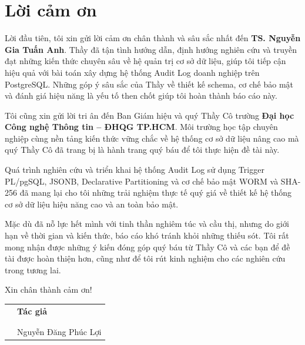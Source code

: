 \chapter*{Lời cảm ơn}

Lời đầu tiên, tôi xin gửi lời cảm ơn chân thành và sâu sắc nhất đến \textbf{TS. Nguyễn Gia Tuấn Anh}. Thầy đã tận tình hướng dẫn, định hướng nghiên cứu và truyền đạt những kiến thức chuyên sâu về hệ quản trị cơ sở dữ liệu, giúp tôi tiếp cận hiệu quả với bài toán xây dựng hệ thống Audit Log doanh nghiệp trên PostgreSQL. Những góp ý sâu sắc của Thầy về thiết kế schema, cơ chế bảo mật và đánh giá hiệu năng là yếu tố then chốt giúp tôi hoàn thành báo cáo này.

Tôi cũng xin gửi lời tri ân đến Ban Giám hiệu và quý Thầy Cô trường \textbf{Đại học Công nghệ Thông tin -- ĐHQG TP.HCM}. Môi trường học tập chuyên nghiệp cùng nền tảng kiến thức vững chắc về hệ thống cơ sở dữ liệu nâng cao mà quý Thầy Cô đã trang bị là hành trang quý báu để tôi thực hiện đề tài này.

Quá trình nghiên cứu và triển khai hệ thống Audit Log sử dụng Trigger PL/pgSQL, JSONB, Declarative Partitioning và cơ chế bảo mật WORM và SHA-256 đã mang lại cho tôi những trải nghiệm thực tế quý giá về thiết kế hệ thống cơ sở dữ liệu hiệu năng cao và an toàn bảo mật.

Mặc dù đã nỗ lực hết mình với tinh thần nghiêm túc và cầu thị, nhưng do giới hạn về thời gian và kiến thức, báo cáo khó tránh khỏi những thiếu sót. Tôi rất mong nhận được những ý kiến đóng góp quý báu từ Thầy Cô và các bạn để đề tài được hoàn thiện hơn, cũng như để tôi rút kinh nghiệm cho các nghiên cứu trong tương lai.

Xin chân thành cảm ơn!

\vspace{2cm}

{
\begin{center}
\centering
\begin{tabular}{>{\centering}m{}>{\centering\arraybackslash}m{}}
 & \textbf{Tác giả} \\
 & \\
 & \\
 & Nguyễn Đăng Phúc Lợi
\end{tabular}
\end{center}
}
